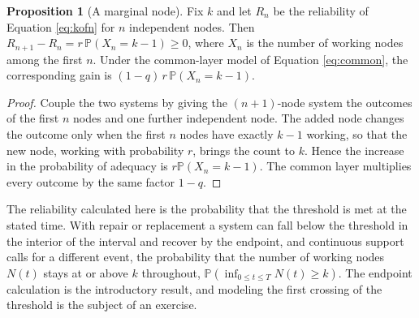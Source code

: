 \documentclass[11pt,openany]{book}
\theoremstyle{definition}
\newtheorem{proposition}{Proposition}[chapter]
\theoremstyle{remark}
\renewcommand{\Pr}{\mathbb{P}}
\begin{document}
\begin{proposition}[A marginal node]
\label{prop:node}
Fix $k$ and let $R_n$ be the reliability of Equation \eqref{eq:kofn} for $n$ independent nodes. Then $R_{n+1}-R_n=r\,\Pr(X_n=k-1)\ge0$, where $X_n$ is the number of working nodes among the first $n$. Under the common-layer model of Equation \eqref{eq:common}, the corresponding gain is $(1-q)\,r\,\Pr(X_n=k-1)$.
\end{proposition}

\begin{proof}
Couple the two systems by giving the $(n+1)$-node system the outcomes of the first $n$ nodes and one further independent node. The added node changes the outcome only when the first $n$ nodes have exactly $k-1$ working, so that the new node, working with probability $r$, brings the count to $k$. Hence the increase in the probability of adequacy is $r\Pr(X_n=k-1)$. The common layer multiplies every outcome by the same factor $1-q$.
\end{proof}

The reliability calculated here is the probability that the threshold is met at the stated time. With repair or replacement a system can fall below the threshold in the interior of the interval and recover by the endpoint, and continuous support calls for a different event, the probability that the number of working nodes $N(t)$ stays at or above $k$ throughout, $\Pr(\inf_{0\le t\le T}N(t)\ge k)$. The endpoint calculation is the introductory result, and modeling the first crossing of the threshold is the subject of an exercise.
\end{document}

